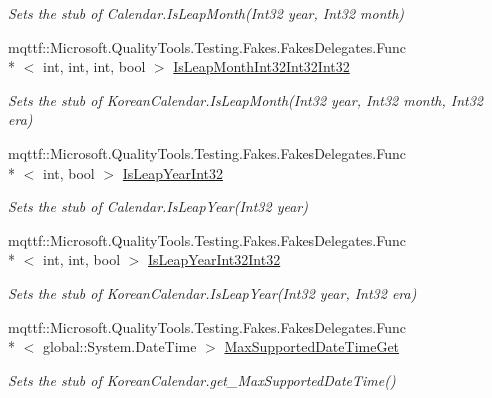 \begin{DoxyCompactItemize}
\begin{DoxyCompactList}\small\item\em Sets the stub of Calendar.\-Is\-Leap\-Month(\-Int32 year, Int32 month)\end{DoxyCompactList}\item 
mqttf\-::\-Microsoft.\-Quality\-Tools.\-Testing.\-Fakes.\-Fakes\-Delegates.\-Func\\*
$<$ int, int, int, bool $>$ \hyperlink{class_system_1_1_globalization_1_1_fakes_1_1_stub_korean_calendar_af18cdcfbf2afb08ced8db8bbc8d132de}{Is\-Leap\-Month\-Int32\-Int32\-Int32}
\begin{DoxyCompactList}\small\item\em Sets the stub of Korean\-Calendar.\-Is\-Leap\-Month(\-Int32 year, Int32 month, Int32 era)\end{DoxyCompactList}\item 
mqttf\-::\-Microsoft.\-Quality\-Tools.\-Testing.\-Fakes.\-Fakes\-Delegates.\-Func\\*
$<$ int, bool $>$ \hyperlink{class_system_1_1_globalization_1_1_fakes_1_1_stub_korean_calendar_aaec9638e840f7c4b11abe087489f9d74}{Is\-Leap\-Year\-Int32}
\begin{DoxyCompactList}\small\item\em Sets the stub of Calendar.\-Is\-Leap\-Year(\-Int32 year)\end{DoxyCompactList}\item 
mqttf\-::\-Microsoft.\-Quality\-Tools.\-Testing.\-Fakes.\-Fakes\-Delegates.\-Func\\*
$<$ int, int, bool $>$ \hyperlink{class_system_1_1_globalization_1_1_fakes_1_1_stub_korean_calendar_aebeb0612379c99e601c9ad0baace6a8c}{Is\-Leap\-Year\-Int32\-Int32}
\begin{DoxyCompactList}\small\item\em Sets the stub of Korean\-Calendar.\-Is\-Leap\-Year(\-Int32 year, Int32 era)\end{DoxyCompactList}\item 
mqttf\-::\-Microsoft.\-Quality\-Tools.\-Testing.\-Fakes.\-Fakes\-Delegates.\-Func\\*
$<$ global\-::\-System.\-Date\-Time $>$ \hyperlink{class_system_1_1_globalization_1_1_fakes_1_1_stub_korean_calendar_ac825517526e9acc0ff2c16409faa023d}{Max\-Supported\-Date\-Time\-Get}
\begin{DoxyCompactList}\small\item\em Sets the stub of Korean\-Calendar.\-get\-\_\-\-Max\-Supported\-Date\-Time()\end{DoxyCompactList}\item 

\end{DoxyCompactItemize}
